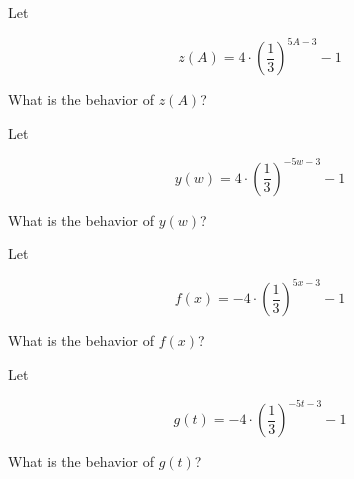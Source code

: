 \documentclass{ximera}
\author{Lee Wayand}
\begin{document}
\begin{exercise}


\begin{question}



Let 

\[
z(A) = 4 \cdot \left(\frac{1}{3}\right)^{5A - 3} - 1
\]


What is the behavior of $z(A)$? 


\begin{multipleChoice}
\end{multipleChoice}

\end{question}







\begin{question}



Let 

\[
y(w) = 4 \cdot \left(\frac{1}{3}\right)^{-5w - 3} - 1
\]


What is the behavior of $y(w)$? 


\begin{multipleChoice}
\end{multipleChoice}

\end{question}





\begin{question}



Let 

\[
f(x) = -4 \cdot \left(\frac{1}{3}\right)^{5x - 3} - 1
\]


What is the behavior of $f(x)$? 


\begin{multipleChoice}
\end{multipleChoice}

\end{question}








\begin{question}



Let 

\[
g(t) = -4 \cdot \left(\frac{1}{3}\right)^{-5t - 3} - 1
\]


What is the behavior of $g(t)$? 


\begin{multipleChoice}
\end{multipleChoice}

\end{question}








\end{exercise}
\end{document}
